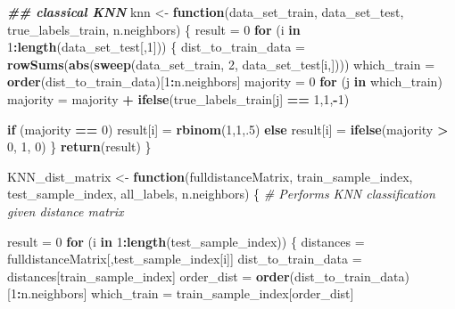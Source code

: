 \documentclass[
]{article}
\newenvironment{Shaded}{\begin{snugshade}}{\end{snugshade}}
\newcommand{\CommentTok}[1]{\textcolor[rgb]{0.56,0.35,0.01}{\textit{#1}}}
\newcommand{\ControlFlowTok}[1]{\textcolor[rgb]{0.13,0.29,0.53}{\textbf{#1}}}
\newcommand{\DecValTok}[1]{\textcolor[rgb]{0.00,0.00,0.81}{#1}}
\newcommand{\DocumentationTok}[1]{\textcolor[rgb]{0.56,0.35,0.01}{\textbf{\textit{#1}}}}
\newcommand{\FunctionTok}[1]{\textcolor[rgb]{0.13,0.29,0.53}{\textbf{#1}}}
\newcommand{\NormalTok}[1]{#1}
\newcommand{\OtherTok}[1]{\textcolor[rgb]{0.56,0.35,0.01}{#1}}
\newcommand{\SpecialCharTok}[1]{\textcolor[rgb]{0.81,0.36,0.00}{\textbf{#1}}}
\begin{document}
\begin{Shaded}
\begin{Highlighting}[]
\DocumentationTok{\#\# classical KNN }
\NormalTok{knn }\OtherTok{\textless{}{-}} \ControlFlowTok{function}\NormalTok{(data\_set\_train, data\_set\_test, true\_labels\_train, n.neighbors)}
\NormalTok{\{}
\NormalTok{  result }\OtherTok{=} \DecValTok{0}
  \ControlFlowTok{for}\NormalTok{ (i }\ControlFlowTok{in} \DecValTok{1}\SpecialCharTok{:}\FunctionTok{length}\NormalTok{(data\_set\_test[,}\DecValTok{1}\NormalTok{]))}
\NormalTok{  \{}
\NormalTok{    dist\_to\_train\_data }\OtherTok{=} \FunctionTok{rowSums}\NormalTok{(}\FunctionTok{abs}\NormalTok{(}\FunctionTok{sweep}\NormalTok{(data\_set\_train, }\DecValTok{2}\NormalTok{, data\_set\_test[i,])))}
\NormalTok{    which\_train }\OtherTok{=} \FunctionTok{order}\NormalTok{(dist\_to\_train\_data)[}\DecValTok{1}\SpecialCharTok{:}\NormalTok{n.neighbors]}
\NormalTok{    majority }\OtherTok{=} \DecValTok{0}
    \ControlFlowTok{for}\NormalTok{ (j }\ControlFlowTok{in}\NormalTok{ which\_train)}
\NormalTok{      majority }\OtherTok{=}\NormalTok{ majority }\SpecialCharTok{+} \FunctionTok{ifelse}\NormalTok{(true\_labels\_train[j] }\SpecialCharTok{==} \DecValTok{1}\NormalTok{,}\DecValTok{1}\NormalTok{,}\SpecialCharTok{{-}}\DecValTok{1}\NormalTok{)}
    
    \ControlFlowTok{if}\NormalTok{ (majority }\SpecialCharTok{==} \DecValTok{0}\NormalTok{)}
\NormalTok{      result[i] }\OtherTok{=} \FunctionTok{rbinom}\NormalTok{(}\DecValTok{1}\NormalTok{,}\DecValTok{1}\NormalTok{,.}\DecValTok{5}\NormalTok{)}
    \ControlFlowTok{else}
\NormalTok{      result[i] }\OtherTok{=} \FunctionTok{ifelse}\NormalTok{(majority }\SpecialCharTok{\textgreater{}} \DecValTok{0}\NormalTok{, }\DecValTok{1}\NormalTok{, }\DecValTok{0}\NormalTok{)}
\NormalTok{  \}}
  \FunctionTok{return}\NormalTok{(result)}
\NormalTok{\}}



\NormalTok{KNN\_dist\_matrix }\OtherTok{\textless{}{-}} \ControlFlowTok{function}\NormalTok{(fulldistanceMatrix, train\_sample\_index, test\_sample\_index, all\_labels, n.neighbors)}
\NormalTok{\{}
  \CommentTok{\# Performs KNN classification given distance matrix}
  
\NormalTok{  result }\OtherTok{=} \DecValTok{0}
  \ControlFlowTok{for}\NormalTok{ (i }\ControlFlowTok{in} \DecValTok{1}\SpecialCharTok{:}\FunctionTok{length}\NormalTok{(test\_sample\_index))}
\NormalTok{  \{}
\NormalTok{    distances }\OtherTok{=}\NormalTok{ fulldistanceMatrix[,test\_sample\_index[i]]}
\NormalTok{    dist\_to\_train\_data }\OtherTok{=}\NormalTok{ distances[train\_sample\_index]}
\NormalTok{    order\_dist }\OtherTok{=} \FunctionTok{order}\NormalTok{(dist\_to\_train\_data)[}\DecValTok{1}\SpecialCharTok{:}\NormalTok{n.neighbors]}
\NormalTok{    which\_train }\OtherTok{=}\NormalTok{ train\_sample\_index[order\_dist]}
    

\end{Highlighting}
\end{Shaded}
\end{document}
